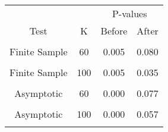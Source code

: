 \begin{table}[!h]
\centering
\begin{tabular}{cccc}
\toprule
\multicolumn{1}{c}{ } & \multicolumn{1}{c}{ } & \multicolumn{2}{c}{P-values} \\
\cmidrule(l{3pt}r{3pt}){3-4}
Test & K & Before & After\\
\midrule
\cellcolor{gray!6}{Finite Sample} & \cellcolor{gray!6}{40} & \cellcolor{gray!6}{0.005} & \cellcolor{gray!6}{0.114}\\
Finite Sample & 60 & 0.005 & 0.080\\
\cellcolor{gray!6}{Finite Sample} & \cellcolor{gray!6}{80} & \cellcolor{gray!6}{0.005} & \cellcolor{gray!6}{0.035}\\
Finite Sample & 100 & 0.005 & 0.035\\
\cellcolor{gray!6}{Asymptotic} & \cellcolor{gray!6}{40} & \cellcolor{gray!6}{0.000} & \cellcolor{gray!6}{0.066}\\
\addlinespace
Asymptotic & 60 & 0.000 & 0.077\\
\cellcolor{gray!6}{Asymptotic} & \cellcolor{gray!6}{80} & \cellcolor{gray!6}{0.000} & \cellcolor{gray!6}{0.083}\\
Asymptotic & 100 & 0.000 & 0.057\\
\cellcolor{gray!6}{ECE} & \cellcolor{gray!6}{} & \cellcolor{gray!6}{0.480} & \cellcolor{gray!6}{0.135}\\
\bottomrule
\end{tabular}
\end{table}
